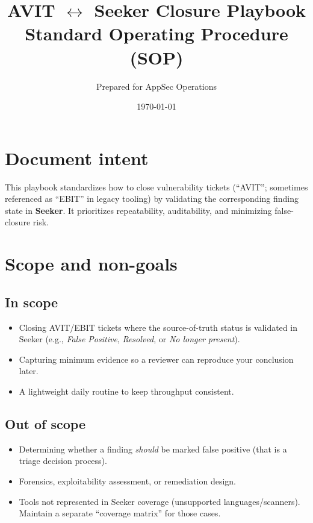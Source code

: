 \documentclass[11pt]{article}
\title{\textbf{AVIT \texorpdfstring{$\leftrightarrow$}{<->} Seeker Closure Playbook}\\
\large Standard Operating Procedure (SOP)}
\author{Prepared for AppSec Operations}
\date{\today}
\begin{document}
\maketitle
\vspace{-0.5em}

\section*{Document intent}
This playbook standardizes how to close vulnerability tickets (``AVIT''; sometimes referenced as ``EBIT'' in legacy tooling) by validating the corresponding finding state in \textbf{Seeker}. It prioritizes repeatability, auditability, and minimizing false-closure risk.

\tableofcontents
\newpage

\section{Scope and non-goals}
\subsection*{In scope}
\begin{itemize}[leftmargin=*]
  \item Closing AVIT/EBIT tickets where the source-of-truth status is validated in Seeker (e.g., \textit{False Positive}, \textit{Resolved}, or \textit{No longer present}).
  \item Capturing minimum evidence so a reviewer can reproduce your conclusion later.
  \item A lightweight daily routine to keep throughput consistent.
\end{itemize}

\subsection*{Out of scope}
\begin{itemize}[leftmargin=*]
  \item Determining whether a finding \emph{should} be marked false positive (that is a triage decision process).
  \item Forensics, exploitability assessment, or remediation design.
  \item Tools not represented in Seeker coverage (unsupported languages/scanners). Maintain a separate ``coverage matrix'' for those cases.
\end{itemize}
\end{document}
